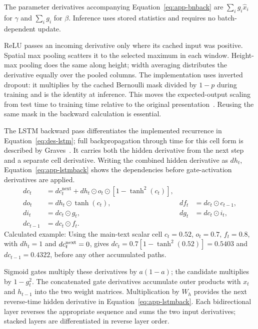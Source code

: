 The parameter derivatives accompanying Equation~\ref{eq:app-bnback} are $\sum_i g_i\widehat x_i$ for $\gamma$ and $\sum_i g_i$ for $\beta$. Inference uses stored statistics and requires no batch-dependent update.~\cite[train.py; segment.py; style.py]{braunepipeline2026}

ReLU passes an incoming derivative only where its cached input was positive. Spatial max pooling scatters it to the selected maximum in each window. Height-max pooling does the same along height; width averaging distributes the derivative equally over the pooled columns. The implementation uses inverted dropout: it multiplies by the cached Bernoulli mask divided by $1-p$ during training and is the identity at inference. This moves the expected-output scaling from test time to training time relative to the original presentation~\cite[pp.~1931, 1934]{srivastava2014}. Reusing the same mask in the backward calculation is essential.~\cite[train.py; segment.py; style.py]{braunepipeline2026}

The LSTM backward pass differentiates the implemented recurrence in Equation~\ref{eq:des-lstm}; full backpropagation through time for this cell form is described by Graves~\cite[pp.~4--5]{graves2013}. It carries both the hidden derivative from the next step and a separate cell derivative. Writing the combined hidden derivative as $d h_t$, Equation~\ref{eq:app-lstmback} shows the dependencies before gate-activation derivatives are applied.
\begin{equation}
\begin{aligned}
d c_t&=d c_t^{\mathrm{next}}+d h_t\odot o_t\odot[1-\tanh^2(c_t)],\\
d o_t&=d h_t\odot\tanh(c_t),& d f_t&=d c_t\odot c_{t-1},\\
d i_t&=d c_t\odot g_t,&d g_t&=d c_t\odot i_t,\\
d c_{t-1}&=d c_t\odot f_t.
\end{aligned}
\label{eq:app-lstmback}
\end{equation}
Calculated example: Using the main-text scalar cell $c_t=0.52$, $o_t=0.7$, $f_t=0.8$, with $dh_t=1$ and $dc_t^{\rm next}=0$, gives $dc_t=0.7[1-\tanh^2(0.52)]=0.5403$ and $dc_{t-1}=0.4322$, before any other accumulated paths. \cite[train.py, LstmBackward]{braunepipeline2026}

Sigmoid gates multiply these derivatives by $a(1-a)$; the candidate multiplies by $1-g_t^2$. The concatenated gate derivatives accumulate outer products with $x_t$ and $h_{t-1}$ into the two weight matrices. Multiplication by $W_h$ provides the next reverse-time hidden derivative in Equation~\ref{eq:app-lstmback}. Each bidirectional layer reverses the appropriate sequence and sums the two input derivatives; stacked layers are differentiated in reverse layer order.~\cite[train.py; segment.py; style.py]{braunepipeline2026}

